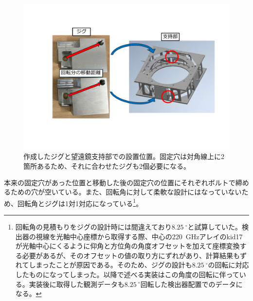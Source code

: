 \begin{figure}[htbp]
  \centering
  \includegraphics[width=0.85\columnwidth]{5_alignment/figs/jig_making.pdf}
  \caption{作成したジグと望遠鏡支持部での設置位置。固定穴は対角線上に2箇所あるため、それに合わせたジグも2個必要になる。}
  \label{jig_fixing}
\end{figure}
本来の固定穴があった位置と移動した後の固定穴の位置にそれぞれボルトで締めるための穴が空いている。また、回転角に対して柔軟な設計にはなっていないため、回転角とジグは1対1対応になっている\footnote{回転角の見積もりをジグの設計時には間違えており$\SI{8.25}{^{\circ}}$と試算していた。検出器の視線を光軸中心座標から取得する際、中心の\SI{220}{GHz}アレイのkid17が光軸中心にくるように仰角と方位角の角度オフセットを加えて座標変換する必要があるが、そのオフセットの値の取り方にずれがあり、計算結果もずれてしまったことが原因である。そのため、ジグの設計も$\SI{8.25}{^{\circ}}$の回転に対応したものになってしまった。以降で述べる実装はこの角度の回転に伴っている。実装後に取得した観測データも$\SI{8.25}{^{\circ}}$回転した検出器配置でのデータになる。}。


